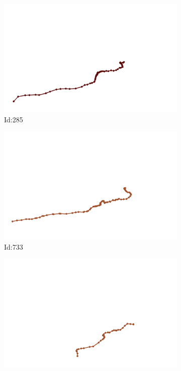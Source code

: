 \documentclass[12pt,twoside]{report}
\begin{document}
\begin{figure}
\centering
\begin{subfigure}[b]{0.20\textwidth}
\centering
\includegraphics[width=\textwidth]{../../trajectories/285.png}
\caption{Id:285}
\end{subfigure}
\begin{subfigure}[b]{0.20\textwidth}
\centering
\includegraphics[width=\textwidth]{../../trajectories/733.png}
\caption{Id:733}
\end{subfigure}
\begin{subfigure}[b]{0.20\textwidth}
\centering
\includegraphics[width=\textwidth]{../../trajectories/803.png}

\end{subfigure}
\end{figure}
\end{document}
